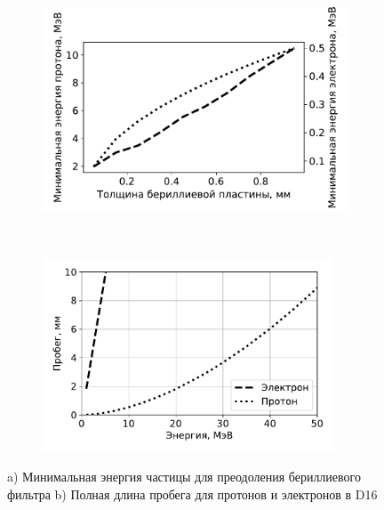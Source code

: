 \documentclass[12pt, a4paper, notitlepage, onecolumn]{article}
\begin{document}
\begin{figure}[ht!]
	\begin{subfigure}[b]{0.5\textwidth}
    	\includegraphics[width=0.95\linewidth]{pictures/03_berillium.pdf}
        \caption{}
        \label{pic-02-a}
    \end{subfigure}
	~
    \begin{subfigure}[b]{0.5\textwidth}
		\includegraphics[width=0.95\textwidth]{pictures/04_casing.pdf}
        \caption{}
        \label{pic-02-b}
    \end{subfigure}
    \caption{ a) Минимальная энергия частицы для преодоления бериллиевого фильтра b) Полная длина пробега для протонов и электронов в D16}
\end{figure}
\end{document}
